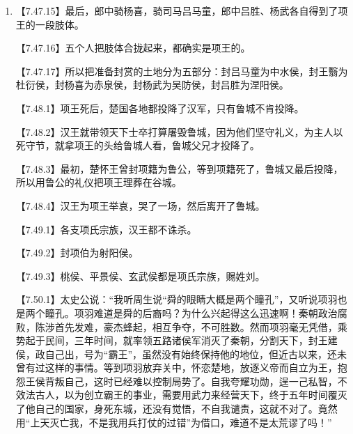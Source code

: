 \documentclass[fontset=none,11pt,a4paper]{ctexart}
\begin{document}
\begin{enumerate}[label=\Alph*.]
\noindent 【7.24.19】番君的将领梅捐战功很多，所以封为十万户侯。\par
\noindent 【7.24.20】项王自立为西楚霸王，封有九郡，建都彭城。\par
\noindent 【7.25.1】汉元年四月，在项王硅麾之下诸侯罢兵散归，各自回到封国。\par
\noindent 【7.25.2】项王也出关回到封国，派人迁徙义帝，说：“古代做帝王的拥有千里见方的土地，必须住在上游。”于是就派遣使者把义帝迁往长沙郴县。\par
\noindent 【7.25.3】项王催促义帝快些动身，义帝群臣渐渐背叛了他，项王就暗中命令衡山王、临江王把义帝击杀在江中。\par
\noindent 【7.25.4】韩王成没有军功，项王不让他就国，一起到了彭城，废去王号，改封为侯，不久又杀死了。\par
\noindent 【7.25.5】臧荼到了封国，就驱逐韩广去辽东，韩广不服从，臧茶在无终击杀了韩广，兼并了他的封地。\par
\noindent 【7.26.1】田荣听说项羽把齐王市徒封胶东，而立齐将田都为齐王，十分气愤，不愿让齐王去胶东，就据齐反叛，迎击田都。\par
  \item
\noindent 【7.47.15】最后，郎中骑杨喜，骑司马吕马童，郎中吕胜、杨武各自得到了项王的一段肢体。\par
\noindent 【7.47.16】五个人把肢体合拢起来，都确实是项王的。\par
\noindent 【7.47.17】所以把准备封赏的土地分为五部分：封吕马童为中水侯，封王翳为杜衍侯，封杨喜为赤泉侯，封杨武为吴防侯，封吕胜为涅阳侯。\par
\noindent 【7.48.1】项王死后，楚国各地都投降了汉军，只有鲁城不肯投降。\par
\noindent 【7.48.2】汉王就带领天下士卒打算屠毁鲁城，因为他们坚守礼义，为主人以死守节，就拿项王的头给鲁城人看，鲁城父兄才投降了。\par
\noindent 【7.48.3】最初，楚怀王曾封项籍为鲁公，等到项籍死了，鲁城又最后投降，所以用鲁公的礼仪把项王理葬在谷城。\par
\noindent 【7.48.4】汉王为项王举哀，哭了一场，然后离开了鲁城。\par
\noindent 【7.49.1】各支项氏宗族，汉王都不诛杀。\par
\noindent 【7.49.2】封项伯为射阳侯。\par
\noindent 【7.49.3】桃侯、平景侯、玄武侯都是项氏宗族，赐姓刘。\par
\noindent 【7.50.1】太史公说：“我听周生说“舜的眼睛大概是两个瞳孔”，又听说项羽也是两个瞳孔。项羽难道是舜的后裔吗？为什么兴起得这么迅速啊！秦朝政治腐败，陈涉首先发难，豪杰蜂起，相互争夺，不可胜数。然而项羽毫无凭借，乘势起于民间，三年时间，就率领五路诸侯军消灭了秦朝，分割天下，封王建侯，政自己出，号为“霸王”，虽然没有始终保持他的地位，但近古以来，还未曾有过这样的事情。等到项羽放弃关中，怀恋楚地，放逐义帝而自立为王，抱怨王侯背叛自己，这时已经难以控制局势了。自我夸耀功勋，逞一己私智，不效法古人，以为创立霸王的事业，需要用武力来经营天下，终于五年时间覆灭了他自己的国家，身死东城，还没有觉悟，不自我谴责，这就不对了。竟然用“上天灭亡我，不是我用兵打仗的过错”为借口，难道不是太荒谬了吗！”\par

\end{enumerate}
\end{document}
